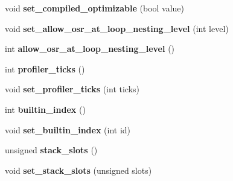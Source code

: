 \begin{DoxyCompactItemize}
\item 
\hypertarget{classv8_1_1internal_1_1_code_a0b80f17b87c990babfb594075002d83a}{}void {\bfseries set\+\_\+compiled\+\_\+optimizable} (bool value)\label{classv8_1_1internal_1_1_code_a0b80f17b87c990babfb594075002d83a}

\item 
\hypertarget{classv8_1_1internal_1_1_code_a083beb6172cea8e743f3c04fae6dfeb9}{}void {\bfseries set\+\_\+allow\+\_\+osr\+\_\+at\+\_\+loop\+\_\+nesting\+\_\+level} (int level)\label{classv8_1_1internal_1_1_code_a083beb6172cea8e743f3c04fae6dfeb9}

\item 
\hypertarget{classv8_1_1internal_1_1_code_a3d72d19d658d733c078932e5f659f6e2}{}int {\bfseries allow\+\_\+osr\+\_\+at\+\_\+loop\+\_\+nesting\+\_\+level} ()\label{classv8_1_1internal_1_1_code_a3d72d19d658d733c078932e5f659f6e2}

\item 
\hypertarget{classv8_1_1internal_1_1_code_a858f3bf9bba2ec680e6f558b586c72b0}{}int {\bfseries profiler\+\_\+ticks} ()\label{classv8_1_1internal_1_1_code_a858f3bf9bba2ec680e6f558b586c72b0}

\item 
\hypertarget{classv8_1_1internal_1_1_code_a2c300beee37a7a8268a8ff63b6e41579}{}void {\bfseries set\+\_\+profiler\+\_\+ticks} (int ticks)\label{classv8_1_1internal_1_1_code_a2c300beee37a7a8268a8ff63b6e41579}

\item 
\hypertarget{classv8_1_1internal_1_1_code_aad03e3d8f814849147c8ce49f77c9e2d}{}int {\bfseries builtin\+\_\+index} ()\label{classv8_1_1internal_1_1_code_aad03e3d8f814849147c8ce49f77c9e2d}

\item 
\hypertarget{classv8_1_1internal_1_1_code_a987c4cb0f7dd6ed7d6e00342be26df9d}{}void {\bfseries set\+\_\+builtin\+\_\+index} (int id)\label{classv8_1_1internal_1_1_code_a987c4cb0f7dd6ed7d6e00342be26df9d}

\item 
\hypertarget{classv8_1_1internal_1_1_code_a06e268e34e4f06ae063011200cf5b4dd}{}unsigned {\bfseries stack\+\_\+slots} ()\label{classv8_1_1internal_1_1_code_a06e268e34e4f06ae063011200cf5b4dd}

\item 
\hypertarget{classv8_1_1internal_1_1_code_ad0aa1c89b7f113da0000fc953adee62c}{}void {\bfseries set\+\_\+stack\+\_\+slots} (unsigned slots)\label{classv8_1_1internal_1_1_code_ad0aa1c89b7f113da0000fc953adee62c}


\end{DoxyCompactItemize}
